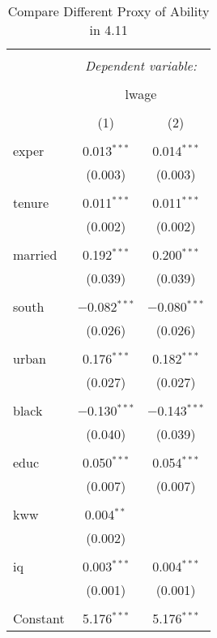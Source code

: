 \documentclass[11pt]{article} %
\begin{document}
\begin{table}[!htbp] \centering 
	\caption{Compare Different Proxy of Ability in 4.11} 
	\label{4.11:table} 
  \begin{tabular}{@{\extracolsep{5pt}}lcc} 
  \\[-1.8ex]\hline 
  \hline \\[-1.8ex] 
   & \multicolumn{2}{c}{\textit{Dependent variable:}} \\ 
  \cline{2-3} 
  \\[-1.8ex] & \multicolumn{2}{c}{lwage} \\ 
  \\[-1.8ex] & (1) & (2)\\ 
  \hline \\[-1.8ex] 
   exper & 0.013$^{***}$ & 0.014$^{***}$ \\ 
	& (0.003) & (0.003) \\ 
	& & \\ 
   tenure & 0.011$^{***}$ & 0.011$^{***}$ \\ 
	& (0.002) & (0.002) \\ 
	& & \\ 
   married & 0.192$^{***}$ & 0.200$^{***}$ \\ 
	& (0.039) & (0.039) \\ 
	& & \\ 
   south & $-$0.082$^{***}$ & $-$0.080$^{***}$ \\ 
	& (0.026) & (0.026) \\ 
	& & \\ 
   urban & 0.176$^{***}$ & 0.182$^{***}$ \\ 
	& (0.027) & (0.027) \\ 
	& & \\ 
   black & $-$0.130$^{***}$ & $-$0.143$^{***}$ \\ 
	& (0.040) & (0.039) \\ 
	& & \\ 
   educ & 0.050$^{***}$ & 0.054$^{***}$ \\ 
	& (0.007) & (0.007) \\ 
	& & \\ 
   kww & 0.004$^{**}$ &  \\ 
	& (0.002) &  \\ 
	& & \\ 
   iq & 0.003$^{***}$ & 0.004$^{***}$ \\ 
	& (0.001) & (0.001) \\ 
	& & \\ 
   Constant & 5.176$^{***}$ & 5.176$^{***}$ \\ 

\end{tabular}
\end{table}
\end{document}
